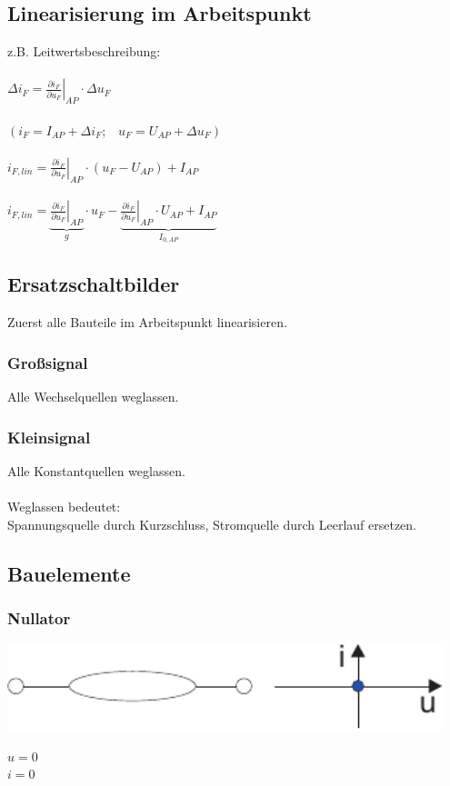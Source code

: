 \documentclass[a4paper,twocolumn,10pt]{article}
\begin{document}
\subsection*{Linearisierung im Arbeitspunkt}
z.B. Leitwertsbeschreibung:\\\\
$\Delta i_F=\left.\frac{\partial i_F}{\partial u_F} \right|_{AP}\cdot \Delta u_F$\\\\
$(i_F=I_{AP}+\Delta i_F;\;\;\;u_F=U_{AP}+\Delta u_F)$\\\\
$i_{F,lin}=\left.\frac{\partial i_F}{\partial u_F} \right|_{AP}\cdot (u_F-U_{AP})+I_{AP}$\\\\
$i_{F,lin}=\underbrace{\left.\frac{\partial i_F}{\partial u_F} \right|_{AP}}_{g}\cdot u_F-\underbrace{\left.\frac{\partial i_F}{\partial u_F} \right|_{AP}\cdot U_{AP}+I_{AP}}_{I_{0,AP}}$

\subsection*{Ersatzschaltbilder}
Zuerst alle Bauteile im Arbeitspunkt linearisieren.
\subsubsection*{Großsignal}
Alle Wechselquellen weglassen.
\subsubsection*{Kleinsignal}
Alle Konstantquellen weglassen.\\\\
Weglassen bedeutet:\\
Spannungsquelle durch Kurzschluss, Stromquelle durch Leerlauf ersetzen.

\subsection*{Bauelemente}
\subsubsection*{Nullator}
\begin{minipage}[b]{0.26\textwidth}
\includegraphics[width=0.95\textwidth]{Grafiken/Nullator}
\end{minipage}
\hfill
\begin{minipage}[b]{0.2\textwidth}
$u=0$\\
$i=0$
\end{minipage}
\end{document}
